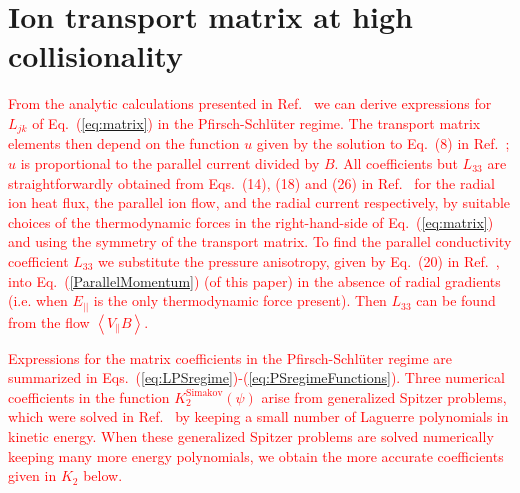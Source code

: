 \documentclass[12pt,superscriptaddress]{revtex4}
\newcommand{\changed}[1]{\textcolor{red}{#1}}
\begin{document}

\section{Ion transport matrix at high collisionality}
\label{apdx:SH}

\changed{
From the analytic calculations presented in Ref.~\cite{AndreiPer2009} we can derive expressions
for $L_{jk}$ of Eq.~(\ref{eq:matrix}) in the Pfirsch-Schl{\"u}ter regime. 
The transport matrix elements then depend on the function $u$ given by the solution to Eq.~(8) in Ref.~\cite{AndreiPer2009};
$u$ is proportional to the parallel current divided by $B$. 
All coefficients but $L_{33}$ are straightforwardly obtained from Eqs.~(14), (18) and (26) in Ref.~\cite{AndreiPer2009} for the radial ion heat flux, the parallel ion flow, and the radial current respectively, by %
suitable choices of 
the thermodynamic forces in the right-hand-side of Eq.~(\ref{eq:matrix}) and using the symmetry of the transport matrix.
To find the parallel conductivity coefficient $L_{33}$ we substitute the pressure anisotropy, given by Eq.~(20) in Ref.~\cite{AndreiPer2009}, into Eq.~(\ref{ParallelMomentum}) (of this paper) 
in the absence of radial gradients (i.e. when $E_{||}$ is the only thermodynamic force present). Then $L_{33}$ can be found from the flow $\left< V_\| B \right>$.
}

\changed{
Expressions for the matrix coefficients in the Pfirsch-Schl{\"u}ter regime are summarized in 
Eqs.~(\ref{eq:LPSregime})-(\ref{eq:PSregimeFunctions}). 
Three numerical coefficients in the function ${K}_2^{\mathrm{Simakov}} \left(\psi\right)$
arise from generalized Spitzer problems, 
which were solved in Ref.~\cite{AndreiPer2009} by keeping a small number of Laguerre polynomials in kinetic energy.
When these generalized Spitzer problems are solved numerically keeping many more energy polynomials,
we obtain the more accurate coefficients given in ${K}_{2}$ below.
}
\end{document}

